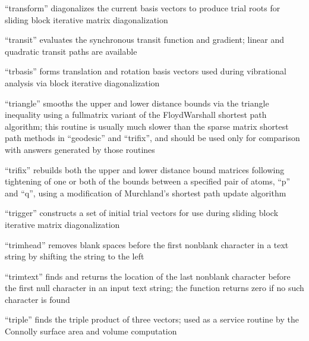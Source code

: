 \documentclass[letterpaper,11pt,english]{sphinxmanual}
\begin{document}

“transform” diagonalizes the current basis vectors to produce
trial roots for sliding block iterative matrix diagonalization


“transit” evaluates the synchronous transit function and
gradient; linear and quadratic transit paths are available


“trbasis” forms translation and rotation basis vectors used
during vibrational analysis via block iterative diagonalization


“triangle” smooths the upper and lower distance bounds via
the triangle inequality using a full\sphinxhyphen{}matrix variant of the
Floyd\sphinxhyphen{}Warshall shortest path algorithm; this routine is
usually much slower than the sparse matrix shortest path
methods in “geodesic” and “trifix”, and should be used only
for comparison with answers generated by those routines


“trifix” rebuilds both the upper and lower distance bound
matrices following tightening of one or both of the bounds
between a specified pair of atoms, “p” and “q”, using a
modification of Murchland’s shortest path update algorithm


“trigger” constructs a set of initial trial vectors for
use during sliding block iterative matrix diagonalization


“trimhead” removes blank spaces before the first non\sphinxhyphen{}blank
character in a text string by shifting the string to the left


“trimtext” finds and returns the location of the last
non\sphinxhyphen{}blank character before the first null character in
an input text string; the function returns zero if no
such character is found


“triple” finds the triple product of three vectors; used as
a service routine by the Connolly surface area and volume
computation
\end{document}
